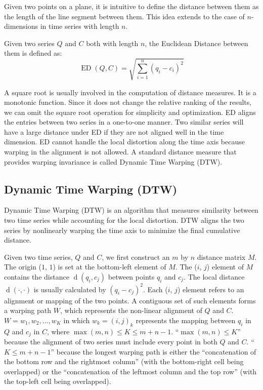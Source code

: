 Given two points on a plane, it is intuitive to define the distance between them as the length of the line segment between them. 
This idea extends to the case of $n$-dimensions in time series with length $n$.

\begin{definition}
    \label{def:ed}
    Given two series $Q$ and $C$ both with length $n$, the Euclidean Distance between them is defined as:
    \begin{equation} 
        \label{eq:ed}
        \operatorname{ED}(Q, C) = \sqrt{\sum_{i=1}^n (q_i-c_i)^2}
    \end{equation}
\end{definition}

A square root is usually involved in the computation of distance measures.
It is a monotonic function. Since it does not change the relative ranking of the results, we can omit the square root operation for simplicity and optimization.
ED aligns the entries between two series in a one-to-one manner.
Two similar series will have a large distance under ED if they are not aligned well in the time dimension.
ED cannot handle the local distortion along the time axis because warping in the alignment is not allowed.
A standard distance measure that provides warping invariance is called Dynamic Time Warping (DTW).

\subsection{Dynamic Time Warping (DTW)} %

Dynamic Time Warping (DTW) is an algorithm that measures similarity between two time series while accounting for the local distortion.
DTW aligns the two series by nonlinearly warping the time axis to minimize the final cumulative distance.

Given two time series, $Q$ and $C$, we first construct an $m$ by $n$ distance matrix $M$.
The origin ($1$, $1$) is set at the bottom-left element of $M$.
The ($i$, $j$) element of $M$ contains the distance $\operatorname{d}(q_i, c_j)$ between points $q_i$ and $c_j$.
The local distance $\operatorname{d}(\cdot, \cdot)$ is usually calculated by $(q_i - c_j)^2$.
Each ($i$, $j$) element refers to an alignment or mapping of the two points.
A contiguous set of such elements forms a warping path $W$, which represents the non-linear alignment of $Q$ and $C$.
$W = w_1, w_2, ..., w_K$ in which $w_k = (i, j)_k$ represents the mapping between $q_i$ in $Q$ and $c_j$ in $C$, where $\max(m, n) \leq K \leq m + n -1$.
``$\max(m, n) \leq K$'' because the alignment of two series must include every point in both $Q$ and $C$.
``$K \leq m + n -1$'' because the longest warping path is either the ``concatenation of the bottom row and the rightmost column'' (with the bottom-right cell being overlapped) or the ``concatenation of the leftmost column and the top row'' (with the top-left cell being overlapped).


